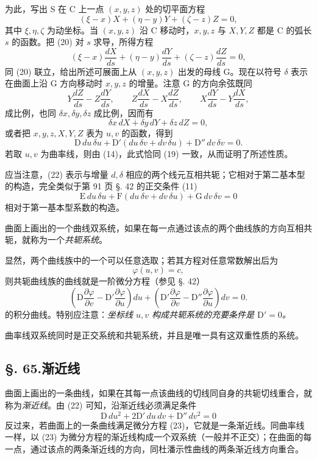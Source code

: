 为此，写出 S 在 C 上一点 \((x,y,z)\) 处的切平面方程
\begin{equation}\tag{20}
(\xi-x)X+(\eta-y)Y+(\zeta-z)Z=0,
\end{equation}
其中 \(\xi,\eta,\zeta\) 为动坐标。当 \((x,y,z)\) 沿 C 移动时，\(x,y,z\) 与 \(X,Y,Z\) 都是 C 的弧长 \(s\) 的函数。把 (20) 对 \(s\) 求导，所得方程
\begin{equation}\tag{21}
(\xi-x)\frac{dX}{ds}+(\eta-y)\frac{dY}{ds}+(\zeta-z)\frac{dZ}{ds}=0,
\end{equation}
同 (20) 联立，给出所述可展面上从 \((x,y,z)\) 出发的母线 G。现在以符号 \(\delta\) 表示在曲面上沿 G 方向移动时 \(x,y,z\) 的增量。注意 G 的方向余弦既同
\[
Y\frac{dZ}{ds}-Z\frac{dY}{ds},\qquad
Z\frac{dX}{ds}-X\frac{dZ}{ds},\qquad
X\frac{dY}{ds}-Y\frac{dX}{ds},
\]
成比例，也同 \(\delta x,\delta y,\delta z\) 成比例，因而有
\[
\delta x\,dX+\delta y\,dY+\delta z\,dZ=0,
\]
或者把 \(x,y,z,X,Y,Z\) 表为 \(u,v\) 的函数，得到
\begin{equation}\tag{22}
\mathrm{D}\,du\,\delta u+\mathrm{D'}(du\,\delta v+dv\,\delta u)+\mathrm{D''}\,dv\,\delta v=0.
\end{equation}
若取 \(u,v\) 为曲率线，则由 (14)，此式恰同 (19) 一致，从而证明了所述性质。

应当注意，(22) 表示与增量 \(d,\delta\) 相应的两个线元互相共轭；它相对于第二基本型的构造，完全类似于第 91 页 §. 42 的正交条件 (11)
\[
\mathrm{E}\,du\,\delta u+\mathrm{F}(du\,\delta v+dv\,\delta u)+\mathrm{G}\,dv\,\delta v=0
\]
相对于第一基本型系数的构造。

曲面上画出的一个曲线双系统，如果在每一点通过该点的两个曲线族的方向互相共轭，就称为一个\emph{共轭系统}。

显然，两个曲线族中的一个可以任意选取；若其方程对任意常数解出后为
\[
\varphi(u,v)=c,
\]
则共轭曲线族的曲线就是一阶微分方程（参见 §. 42）
\[
\left(\mathrm{D}\frac{\partial\varphi}{\partial v}-\mathrm{D'}\frac{\partial\varphi}{\partial u}\right)du+
\left(\mathrm{D'}\frac{\partial\varphi}{\partial v}-\mathrm{D''}\frac{\partial\varphi}{\partial u}\right)dv=0.
\]
的积分曲线。特别应注意：\emph{坐标线 \(u,v\) 构成共轭系统的充要条件是 \(\mathrm{D'}=0\)。}

曲率线双系统同时是正交系统和共轭系统，并且是唯一具有这双重性质的系统。

\subsection*{§. 65.\quad 渐近线}

曲面上画出的一条曲线，如果在其每一点该曲线的切线同自身的共轭切线重合，就称为\emph{渐近线}。由 (22) 可知，沿渐近线必须满足条件
\begin{equation}\tag{23}
\mathrm{D}\,du^2+2\mathrm{D'}\,du\,dv+\mathrm{D''}\,dv^2=0
\end{equation}
反过来，若曲面上的一条曲线满足微分方程 (23)，它就是一条渐近线。同曲率线一样，以 (23) 为微分方程的渐近线构成一个双系统（一般并不正交）；在曲面的每一点，通过该点的两条渐近线的方向，同杜潘示性曲线的两条渐近线方向重合。

